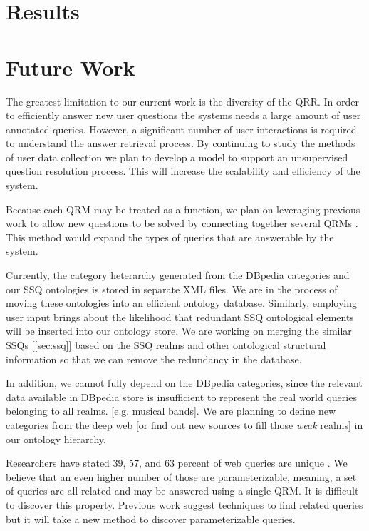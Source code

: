 \section{Results}

\section{Future Work}

The greatest limitation to our current work is the diversity of the QRR.  In order to efficiently answer new user questions the systems needs a large amount of user annotated queries.  However, a significant number of user interactions is required to understand the answer retrieval process.  By continuing to study the methods of user data collection we plan to develop a model to support an unsupervised question resolution process.  This will increase the scalability and efficiency of the system.

Because each QRM may be treated as a function, we plan on leveraging previous work to allow new questions to be solved by connecting together several QRMs \cite{morpheus1, transformscout}.  This method would expand the types of queries that are answerable by the system.

Currently, the category heterarchy generated from the DBpedia categories and our SSQ ontologies is stored in separate XML files. We are in the process of moving these ontologies into an efficient ontology database. Similarly, employing user input brings about the likelihood that redundant SSQ ontological elements will be inserted into our ontology store. We are working on merging the similar SSQs [\ref{sec:ssq}] based on the SSQ realms and other ontological structural information so that we can remove the redundancy in the database.

In addition, we cannot fully depend on the DBpedia categories, since the relevant data available in DBpedia store is insufficient to represent the real world queries belonging to all realms. [e.g. musical bands]. We are planning to define new categories from the deep web [or find out new sources to fill those \textit{weak} realms] in our ontology hierarchy.      

Researchers have stated 39, 57, and 63 percent of web queries are unique \cite{1277770,331405,621942}.  We believe that an even higher number of those are parameterizable, meaning, a set of queries are all related and may be answered using a single QRM.  It is difficult to discover this property.  Previous work suggest techniques to find related queries but it will take a new method to discover parameterizable queries.

